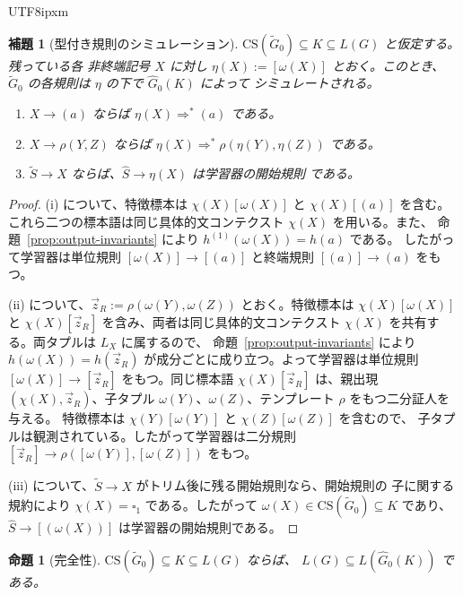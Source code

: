 \documentclass[10pt,a4paper]{article}
\newtheorem{lemma}[theorem]{補題}
\newtheorem{proposition}[theorem]{命題}
\theoremstyle{remark}
\newcommand{\CS}{\mathrm{CS}}
\newcommand{\tuple}[1]{\vec{#1}}
\newcommand{\blank}{\square}
\begin{document}
\begin{CJK}{UTF8}{ipxm}
\begin{lemma}[型付き規則のシミュレーション]
\label{lem:rule-simulation}
\(\CS(\widetilde G_0)\subseteq K\subseteq L(G)\) と仮定する。残っている各
非終端記号 \(X\) に対し \(\eta(X):=[\omega(X)]\) とおく。このとき、
\(\widetilde G_0\) の各規則は \(\eta\) の下で \(\widehat G_0(K)\) によって
シミュレートされる。
\begin{enumerate}[label=(\roman*),leftmargin=*]
\item \(X\to(a)\) ならば \(\eta(X)\Rightarrow^*(a)\) である。
\item \(X\to\rho(Y,Z)\) ならば
\(\eta(X)\Rightarrow^*\rho(\eta(Y),\eta(Z))\) である。
\item \(\widetilde S\to X\) ならば、\(\widehat S\to\eta(X)\) は学習器の開始規則
である。
\end{enumerate}
\end{lemma}

\begin{proof}
(i) について、特徴標本は \(\chi(X)[\omega(X)]\) と \(\chi(X)[(a)]\) を含む。
これら二つの標本語は同じ具体的文コンテクスト \(\chi(X)\) を用いる。また、
命題~\ref{prop:output-invariants} により \(h^{(1)}(\omega(X))=h(a)\) である。
したがって学習器は単位規則 \([\omega(X)]\to[(a)]\) と終端規則
\([(a)]\to(a)\) をもつ。

(ii) について、\(\tuple z_R:=\rho(\omega(Y),\omega(Z))\) とおく。特徴標本は
\(\chi(X)[\omega(X)]\) と \(\chi(X)[\tuple z_R]\) を含み、両者は同じ具体的文コンテクスト
\(\chi(X)\) を共有する。両タプルは \(L_X\) に属するので、
命題~\ref{prop:output-invariants} により
\(h(\omega(X))=h(\tuple z_R)\) が成分ごとに成り立つ。よって学習器は単位規則
\([\omega(X)]\to[\tuple z_R]\) をもつ。同じ標本語
\(\chi(X)[\tuple z_R]\) は、親出現 \((\chi(X),\tuple z_R)\)、子タプル
\(\omega(Y)\)、\(\omega(Z)\)、テンプレート \(\rho\) をもつ二分証人を与える。
特徴標本は \(\chi(Y)[\omega(Y)]\) と \(\chi(Z)[\omega(Z)]\) を含むので、
子タプルは観測されている。したがって学習器は二分規則
\([\tuple z_R]\to\rho([\omega(Y)],[\omega(Z)])\) をもつ。

(iii) について、\(\widetilde S\to X\) がトリム後に残る開始規則なら、開始規則の
子に関する規約により \(\chi(X)=\blank_1\) である。したがって
\(\omega(X)\in\CS(\widetilde G_0)\subseteq K\) であり、
\(\widehat S\to[(\omega(X))]\) は学習器の開始規則である。
\end{proof}

\begin{proposition}[完全性]
\label{prop:completeness}
\(\CS(\widetilde G_0)\subseteq K\subseteq L(G)\) ならば、
\(L(G)\subseteq L(\widehat G_0(K))\) である。
\end{proposition}


\end{CJK}
\end{document}
